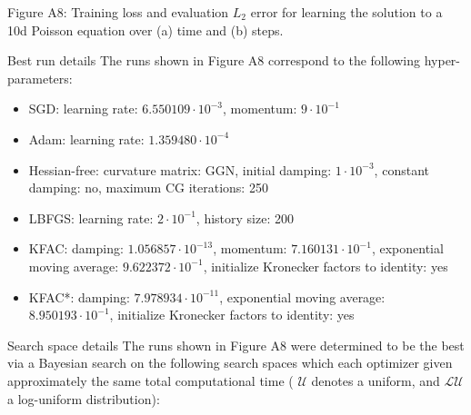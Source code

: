 \documentclass[10pt]{article}
\begin{document}
Figure A8: Training loss and evaluation $L_{2}$ error for learning the solution to a 10d Poisson equation over (a) time and (b) steps.

Best run details The runs shown in Figure A8 correspond to the following hyper-parameters:

\begin{itemize}
  \item SGD: learning rate: $6.550109 \cdot 10^{-3}$, momentum: $9 \cdot 10^{-1}$
  \item Adam: learning rate: $1.359480 \cdot 10^{-4}$
  \item Hessian-free: curvature matrix: GGN, initial damping: $1 \cdot 10^{-3}$, constant damping: no, maximum CG iterations: 250
  \item LBFGS: learning rate: $2 \cdot 10^{-1}$, history size: 200
  \item KFAC: damping: $1.056857 \cdot 10^{-13}$, momentum: $7.160131 \cdot 10^{-1}$, exponential moving average: $9.622372 \cdot 10^{-1}$, initialize Kronecker factors to identity: yes
  \item KFAC*: damping: $7.978934 \cdot 10^{-11}$, exponential moving average: $8.950193 \cdot 10^{-1}$, initialize Kronecker factors to identity: yes
\end{itemize}

Search space details The runs shown in Figure A8 were determined to be the best via a Bayesian search on the following search spaces which each optimizer given approximately the same total computational time ( $\mathcal{U}$ denotes a uniform, and $\mathcal{L U}$ a log-uniform distribution):
\end{document}
